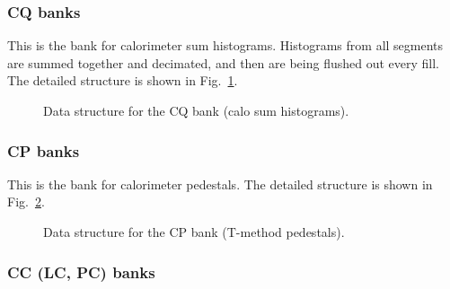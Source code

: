 \subsubsection*{CQ banks}

This is the bank for calorimeter sum histograms. Histograms from all segments are summed together and decimated, and then are being flushed out every fill. The detailed structure is shown in Fig.~\ref{fig:CQBankFormat}.

\begin{figure}[htbp]
\centering
{}
\caption{Data structure for the CQ bank (calo sum histograms).}\label{fig:CQBankFormat}
\end{figure}

\subsubsection*{CP banks}

This is the bank for calorimeter pedestals. The detailed structure is shown in Fig.~\ref{fig:CPBankFormat}.

\begin{figure}[htbp]
\centering
{} 
\caption{Data structure for the CP bank (T-method pedestals).}\label{fig:CPBankFormat}
\end{figure}

\subsubsection*{CC (LC, PC) banks}

